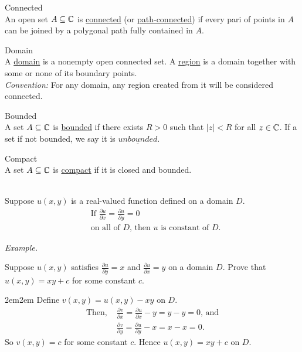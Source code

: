 \documentclass[10pt]{paper}
\newcommand{\gspc}{\vspace{0.13cm}} %
\newcommand{\gline}[0]{\gspc\\} %
\newcommand{\ul}[1]{\underline{#1}}
\let\endoldproof\endproof
\renewenvironment{proof}[1][\proofname]
  {\vspace{0.2cm}\begin{adjustwidth}{2em}{2em}
   \oldproof[#1]}
  {\endoldproof
\end{adjustwidth}}
\renewenvironment{example}{
  \begin{tcolorbox}[colback=gray!2, colframe=gray!40!white, coltitle=green!20!black, boxrule=3pt, sharp corners, breakable]
    \textit{Example.}
}{\end{tcolorbox}}
\begin{document}
\begin{definition}{Connected}{}\gline{}
  An open set $A\subseteq \mathbb{C}$ is \ul{connected} (or \ul{path-connected}) if every pari of points in $A$ can be joined by a polygonal path fully contained in $A$.
\end{definition}
\begin{definition}{Domain}{}\gline{}
  A \ul{domain} is a nonempty open connected set. A \ul{region} is a domain together with some or none of its boundary points.\gline{}
  \textit{Convention: }For any domain, any region created from it will be considered connected. 
\end{definition}
\begin{definition}{Bounded}{}\gline{}
  A set $A\subseteq \mathbb{C}$ is \ul{bounded} if there exists $R > 0$ such that $|z|<R$ for all $z\in \mathbb{C}$. If a set if not bounded, we say it is $\ul{unbounded}$. 
\end{definition}
\begin{definition}{Compact}{}\gline{}
  A set $A\subseteq \mathbb{C}$ is \ul{compact} if it is closed and bounded. 
\end{definition}
\begin{theorem}{}{}\gline{}
  Suppose $u(x,y)$ is a real-valued function defined on a domain $D$. 
  \begin{align*}
    &\text{If }\frac{\partial u}{\partial x}=\frac{\partial u}{\partial y}=0\\
    &\text{on all of }D\text{, then }u\text{ is constant of }D.
  \end{align*}
  \begin{example}
    Suppose $u(x,y)$ satisfies $\frac{\partial u}{\partial y}= x$ and $\frac{\partial u}{\partial x} = y$ on a domain $D$. Prove that $u(x,y) = xy+c$ for some constant $c$. 
    \begin{proof}
      Define $v(x,y) = u(x,y)-xy$ on $D$.
      \begin{align*}
        \text{Then, }&\frac{\partial v}{\partial x}=\frac{\partial u}{\partial x}-y = y-y = 0\text{, and}\\
        &\frac{\partial v}{\partial y}=\frac{\partial u}{\partial y}-x = x-x = 0.
      \end{align*} 
      So $v(x,y) = c$ for some constant $c$. Hence $u(x,y) = xy+c$ on $D$.
    \end{proof}
  \end{example}
\end{theorem}
\end{document}
